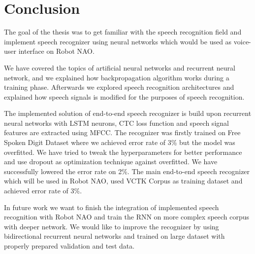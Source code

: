 \chapter{Conclusion}

The goal of the thesis was to get familiar with the speech recognition field and implement speech recognizer using neural networks which would be used as voice-user interface on Robot NAO.

We have covered the topics of artificial neural networks and recurrent neural network, and we explained how backpropagation algorithm works during a training phase.
Afterwards we explored speech recognition architectures and explained how speech signals is modified for the purposes of speech recognition.

The implemented solution of end-to-end speech recognizer is build upon recurrent neural networks with LSTM neurons, CTC loss function and speech signal features are extracted using MFCC.
The recognizer was firstly trained on Free Spoken Digit Dataset where we achieved error rate of 3\% but the model was overfitted.
We have tried to tweak the hyperparameters for better performance and use dropout as optimization technique against overfitted.
We have successfully lowered the error rate on 2\%.
The main end-to-end speech recognizer which will be used in Robot NAO, used VCTK Corpus as training dataset and achieved error rate of $3\%$.

In future work we want to finish the integration of implemented speech recognition with Robot NAO and train the RNN on more complex speech corpus with deeper network.
We would like to improve the recognizer by using bidirectional recurrent neural networks and trained on large dataset with properly prepared validation and test data.
